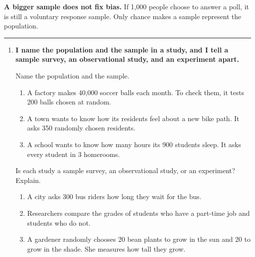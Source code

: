 \documentclass[11pt]{article}
\newcommand{\lessonhead}[1]{\par\vspace{0.6em}{\large\bfseries #1}\par\vspace{0.25em}\hrule\vspace{0.6em}}
\newcommand{\goal}[1]{\textbf{#1}\par\vspace{0.35em}}
\begin{document}
\vspace{0.6em}
\textbf{A bigger sample does not fix bias.} If 1,000 people choose to answer a poll, it is still a voluntary response sample. Only chance makes a sample represent the population.

\partner

\newpage
\lessonhead{5.1 - Samples, Studies, and Bias}
\begin{enumerate}

\item \goal{I name the population and the sample in a study, and I tell a sample survey, an observational study, and an experiment apart.}
Name the population and the sample.
\begin{enumerate}
  \item A factory makes 40,000 soccer balls each month. To check them, it tests 200 balls chosen at random.

  \work{2.4em}
  \item A town wants to know how its residents feel about a new bike path. It asks 350 randomly chosen residents.

  \work{2.4em}
  \item A school wants to know how many hours its 900 students sleep. It asks every student in 3 homerooms.

  \work{2.4em}
\end{enumerate}

\vspace{0.6em}
Is each study a sample survey, an observational study, or an experiment? Explain.
\begin{enumerate}[start=4]
  \item A city asks 300 bus riders how long they wait for the bus.

  \work{2.4em}
  \item Researchers compare the grades of students who have a part-time job and students who do not.

  \work{2.4em}
  \item A gardener randomly chooses 20 bean plants to grow in the sun and 20 to grow in the shade. She measures how tall they grow.


\end{enumerate}
\end{enumerate}
\end{document}
